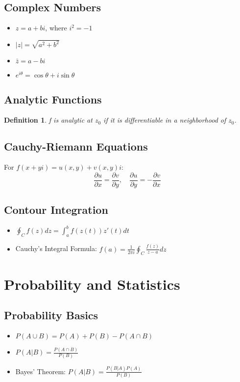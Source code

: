 \documentclass[10pt,a4paper,twocolumn]{article}
\newtheorem{definition}[theorem]{Definition}
\begin{document}
\subsection{Complex Numbers}
\begin{itemize}[leftmargin=*]
\item $z = a + bi$, where $i^2 = -1$
\item $|z| = \sqrt{a^2 + b^2}$
\item $\bar{z} = a - bi$
\item $e^{i\theta} = \cos\theta + i\sin\theta$
\end{itemize}

\subsection{Analytic Functions}
\begin{definition}
f is analytic at $z_0$ if it is differentiable in a neighborhood of $z_0$.
\end{definition}

\subsection{Cauchy-Riemann Equations}
For $f(x+yi) = u(x,y) + v(x,y)i$:
\begin{equation*}
\frac{\partial u}{\partial x} = \frac{\partial v}{\partial y}, \quad \frac{\partial u}{\partial y} = -\frac{\partial v}{\partial x}
\end{equation*}

\subsection{Contour Integration}
\begin{itemize}[leftmargin=*]
\item $\oint_C f(z) dz = \int_a^b f(z(t)) z'(t) dt$
\item Cauchy's Integral Formula: $f(a) = \frac{1}{2\pi i} \oint_C \frac{f(z)}{z-a} dz$
\end{itemize}

\section{Probability and Statistics}

\subsection{Probability Basics}
\begin{itemize}[leftmargin=*]
\item $P(A \cup B) = P(A) + P(B) - P(A \cap B)$
\item $P(A|B) = \frac{P(A \cap B)}{P(B)}$
\item Bayes' Theorem: $P(A|B) = \frac{P(B|A)P(A)}{P(B)}$
\end{itemize}
\end{document}
